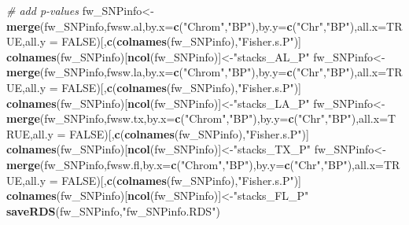 \documentclass[]{article}
\newenvironment{Shaded}{\begin{snugshade}}{\end{snugshade}}
\newcommand{\KeywordTok}[1]{\textcolor[rgb]{0.13,0.29,0.53}{\textbf{#1}}}
\newcommand{\DataTypeTok}[1]{\textcolor[rgb]{0.13,0.29,0.53}{#1}}
\newcommand{\StringTok}[1]{\textcolor[rgb]{0.31,0.60,0.02}{#1}}
\newcommand{\CommentTok}[1]{\textcolor[rgb]{0.56,0.35,0.01}{\textit{#1}}}
\newcommand{\OtherTok}[1]{\textcolor[rgb]{0.56,0.35,0.01}{#1}}
\newcommand{\NormalTok}[1]{#1}
\begin{document}
\begin{Shaded}
\begin{Highlighting}[]
\CommentTok{# add p-values}
\NormalTok{fw_SNPinfo<-}\KeywordTok{merge}\NormalTok{(fw_SNPinfo,fwsw.al,}\DataTypeTok{by.x=}\KeywordTok{c}\NormalTok{(}\StringTok{"Chrom"}\NormalTok{,}\StringTok{"BP"}\NormalTok{),}\DataTypeTok{by.y=}\KeywordTok{c}\NormalTok{(}\StringTok{"Chr"}\NormalTok{,}\StringTok{"BP"}\NormalTok{),}\DataTypeTok{all.x=}\OtherTok{TRUE}\NormalTok{,}\DataTypeTok{all.y =} \OtherTok{FALSE}\NormalTok{)[,}\KeywordTok{c}\NormalTok{(}\KeywordTok{colnames}\NormalTok{(fw_SNPinfo),}\StringTok{"Fisher.s.P"}\NormalTok{)] }
\KeywordTok{colnames}\NormalTok{(fw_SNPinfo)[}\KeywordTok{ncol}\NormalTok{(fw_SNPinfo)]<-}\StringTok{"stacks_AL_P"}
\NormalTok{fw_SNPinfo<-}\KeywordTok{merge}\NormalTok{(fw_SNPinfo,fwsw.la,}\DataTypeTok{by.x=}\KeywordTok{c}\NormalTok{(}\StringTok{"Chrom"}\NormalTok{,}\StringTok{"BP"}\NormalTok{),}\DataTypeTok{by.y=}\KeywordTok{c}\NormalTok{(}\StringTok{"Chr"}\NormalTok{,}\StringTok{"BP"}\NormalTok{),}\DataTypeTok{all.x=}\OtherTok{TRUE}\NormalTok{,}\DataTypeTok{all.y =} \OtherTok{FALSE}\NormalTok{)[,}\KeywordTok{c}\NormalTok{(}\KeywordTok{colnames}\NormalTok{(fw_SNPinfo),}\StringTok{"Fisher.s.P"}\NormalTok{)] }
\KeywordTok{colnames}\NormalTok{(fw_SNPinfo)[}\KeywordTok{ncol}\NormalTok{(fw_SNPinfo)]<-}\StringTok{"stacks_LA_P"}
\NormalTok{fw_SNPinfo<-}\KeywordTok{merge}\NormalTok{(fw_SNPinfo,fwsw.tx,}\DataTypeTok{by.x=}\KeywordTok{c}\NormalTok{(}\StringTok{"Chrom"}\NormalTok{,}\StringTok{"BP"}\NormalTok{),}\DataTypeTok{by.y=}\KeywordTok{c}\NormalTok{(}\StringTok{"Chr"}\NormalTok{,}\StringTok{"BP"}\NormalTok{),}\DataTypeTok{all.x=}\OtherTok{TRUE}\NormalTok{,}\DataTypeTok{all.y =} \OtherTok{FALSE}\NormalTok{)[,}\KeywordTok{c}\NormalTok{(}\KeywordTok{colnames}\NormalTok{(fw_SNPinfo),}\StringTok{"Fisher.s.P"}\NormalTok{)] }
\KeywordTok{colnames}\NormalTok{(fw_SNPinfo)[}\KeywordTok{ncol}\NormalTok{(fw_SNPinfo)]<-}\StringTok{"stacks_TX_P"}
\NormalTok{fw_SNPinfo<-}\KeywordTok{merge}\NormalTok{(fw_SNPinfo,fwsw.fl,}\DataTypeTok{by.x=}\KeywordTok{c}\NormalTok{(}\StringTok{"Chrom"}\NormalTok{,}\StringTok{"BP"}\NormalTok{),}\DataTypeTok{by.y=}\KeywordTok{c}\NormalTok{(}\StringTok{"Chr"}\NormalTok{,}\StringTok{"BP"}\NormalTok{),}\DataTypeTok{all.x=}\OtherTok{TRUE}\NormalTok{,}\DataTypeTok{all.y =} \OtherTok{FALSE}\NormalTok{)[,}\KeywordTok{c}\NormalTok{(}\KeywordTok{colnames}\NormalTok{(fw_SNPinfo),}\StringTok{"Fisher.s.P"}\NormalTok{)] }
\KeywordTok{colnames}\NormalTok{(fw_SNPinfo)[}\KeywordTok{ncol}\NormalTok{(fw_SNPinfo)]<-}\StringTok{"stacks_FL_P"}
\KeywordTok{saveRDS}\NormalTok{(fw_SNPinfo,}\StringTok{"fw_SNPinfo.RDS"}\NormalTok{)}
\end{Highlighting}
\end{Shaded}
\end{document}
